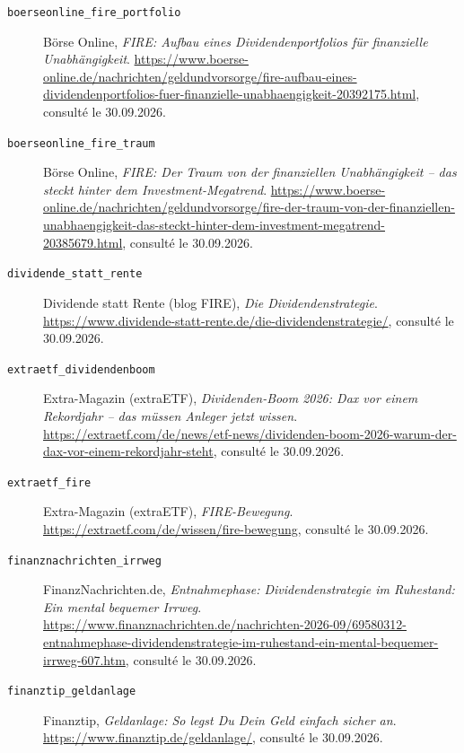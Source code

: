 \begin{description}
\item[\texttt{boerseonline\_fire\_portfolio}] \label{presse:boerseonline_fire_portfolio} Börse Online, \textit{FIRE: Aufbau eines Dividendenportfolios für finanzielle Unabhängigkeit}. \url{https://www.boerse-online.de/nachrichten/geldundvorsorge/fire-aufbau-eines-dividendenportfolios-fuer-finanzielle-unabhaengigkeit-20392175.html}, consulté le 30.09.2026.
\item[\texttt{boerseonline\_fire\_traum}] \label{presse:boerseonline_fire_traum} Börse Online, \textit{FIRE: Der Traum von der finanziellen Unabhängigkeit – das steckt hinter dem Investment-Megatrend}. \url{https://www.boerse-online.de/nachrichten/geldundvorsorge/fire-der-traum-von-der-finanziellen-unabhaengigkeit-das-steckt-hinter-dem-investment-megatrend-20385679.html}, consulté le 30.09.2026.
\item[\texttt{dividende\_statt\_rente}] \label{presse:dividende_statt_rente} Dividende statt Rente (blog FIRE), \textit{Die Dividendenstrategie}. \url{https://www.dividende-statt-rente.de/die-dividendenstrategie/}, consulté le 30.09.2026.
\item[\texttt{extraetf\_dividendenboom}] \label{presse:extraetf_dividendenboom} Extra-Magazin (extraETF), \textit{Dividenden-Boom 2026: Dax vor einem Rekordjahr – das müssen Anleger jetzt wissen}. \url{https://extraetf.com/de/news/etf-news/dividenden-boom-2026-warum-der-dax-vor-einem-rekordjahr-steht}, consulté le 30.09.2026.
\item[\texttt{extraetf\_fire}] \label{presse:extraetf_fire} Extra-Magazin (extraETF), \textit{FIRE-Bewegung}. \url{https://extraetf.com/de/wissen/fire-bewegung}, consulté le 30.09.2026.
\item[\texttt{finanznachrichten\_irrweg}] \label{presse:finanznachrichten_irrweg} FinanzNachrichten.de, \textit{Entnahmephase: Dividendenstrategie im Ruhestand: Ein mental bequemer Irrweg}. \url{https://www.finanznachrichten.de/nachrichten-2026-09/69580312-entnahmephase-dividendenstrategie-im-ruhestand-ein-mental-bequemer-irrweg-607.htm}, consulté le 30.09.2026.
\item[\texttt{finanztip\_geldanlage}] \label{presse:finanztip_geldanlage} Finanztip, \textit{Geldanlage: So legst Du Dein Geld einfach sicher an}. \url{https://www.finanztip.de/geldanlage/}, consulté le 30.09.2026.

\end{description}
